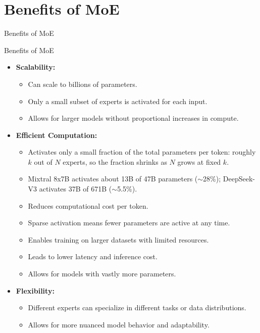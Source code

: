 \section{Benefits of MoE}
\begin{frame}[allowframebreaks]{}
    \LARGE Benefits of MoE
\end{frame}

\begin{frame}[allowframebreaks]{Benefits of MoE}
    \begin{itemize}
        \item \textbf{Scalability:}
        \begin{itemize}
            \item Can scale to billions of parameters.
            \item Only a small subset of experts is activated for each input.
            \item Allows for larger models without proportional increases in compute.
        \end{itemize}
    \framebreak
        \item \textbf{Efficient Computation:}
        \begin{itemize}
            \item Activates only a small fraction of the total parameters per token: roughly $k$ out of $N$ experts, so the fraction shrinks as $N$ grows at fixed $k$.
            \item Mixtral 8x7B activates about 13B of 47B parameters ($\sim$28\%); DeepSeek-V3 activates 37B of 671B ($\sim$5.5\%).
            \item Reduces computational cost per token.
            \item Sparse activation means fewer parameters are active at any time.
            \item Enables training on larger datasets with limited resources.
            \item Leads to lower latency and inference cost.
            \item Allows for models with vastly more parameters.
        \end{itemize}
    \framebreak
        \item \textbf{Flexibility:}
        \begin{itemize}
            \item Different experts can specialize in different tasks or data distributions.
            \item Allows for more nuanced model behavior and adaptability.

\end{itemize}
\end{itemize}
\end{frame}
